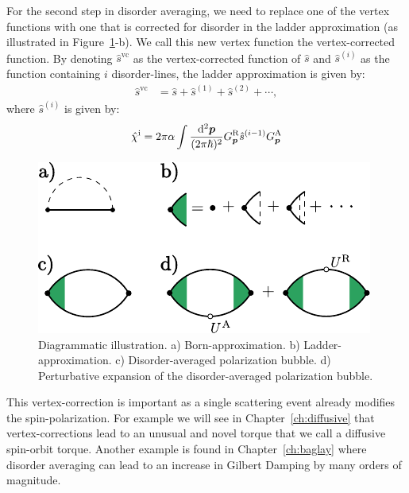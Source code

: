 For the second step in disorder averaging, we need to replace one of the vertex functions with one that is corrected for disorder in the ladder approximation (as illustrated in Figure~\ref{sd:fig:diagrams}-b). We call this new vertex function the vertex-corrected function. 
By denoting $\hat{s}^{\text{vc}}$ as the vertex-corrected function of $\hat{s}$ and $\hat{s}^{(i)}$ as the function containing $i$ disorder-lines, the ladder approximation is given by:
\begin{align}
    \hat{s}^\text{vc}
       & =           
        \hat{s}+\hat{s}^{(1)}+\hat{s}^{(2)}+\cdots,
        \label{sd:eq:ladder}
\end{align}
where $\hat{s}^{(i)}$ is given by:
\begin{align}
    \hat{\chi}^\text{i} = 2\pi\alpha\int\frac{\mathrm{d}^2\boldsymbol{p}}{(2\pi\hslash)^2} G_{\boldsymbol{p}}^\text{R}\hat{s}^{(i-1)}G_{\boldsymbol{p}}^\text{A}
    \label{eq:onedisorderline}
\end{align}

\begin{figure}
    \centering
    \includegraphics{articles/misha_paper/app5.pdf}
    \caption{Diagrammatic illustration. a) Born-approximation. b) Ladder-approximation. c) Disorder-averaged polarization bubble. d) Perturbative expansion of the disorder-averaged polarization bubble. }
    \label{sd:fig:diagrams}
\end{figure}
This vertex-correction is important as a single scattering event already modifies the spin-polarization. For example we will see in Chapter~\ref{ch:diffusive} that vertex-corrections lead to an unusual and novel torque that we call a diffusive spin-orbit torque. Another example is found in Chapter~\ref{ch:baglay} where disorder averaging can lead to an increase in Gilbert Damping by many orders of magnitude. 

